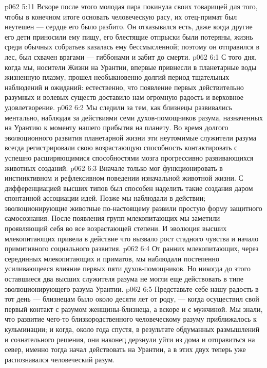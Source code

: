 \vs p062 5:11 Вскоре после этого молодая пара покинула своих товарищей для того, чтобы в конечном итоге основать человеческую расу, их отец\hyp{}примат был неутешен --- сердце его было разбито. Он отказывался есть, даже когда другие его дети приносили ему пищу, его блестящие отпрыски были потеряны, жизнь среди обычных собратьев казалась ему бессмысленной; поэтому он отправился в лес, был схвачен врагами --- гиббонами и забит до смерти.
\vs p062 6:1 С того дня, когда мы, носители Жизни на Урантии, впервые привнесли в планетарные воды жизненную плазму, прошел необыкновенно долгий период тщательных наблюдений и ожиданий: естественно, что появление первых действительно разумных и волевых существ доставило нам огромную радость и верховное удовлетворение.
\vs p062 6:2 Мы следили за тем, как близнецы развивались ментально, наблюдая за действиями семи духов\hyp{}помощников разума, назначенных на Урантию к моменту нашего прибытия на планету. Во время долгого эволюционного развития планетарной жизни эти неутомимые служители разума всегда регистрировали свою возрастающую способность контактировать с успешно расширяющимися способностями мозга прогрессивно развивающихся животных созданий.
\vs p062 6:3 Вначале только  мог функционировать в инстинктивном и рефлексивном поведении изначальной животной жизни. С дифференциацией высших типов  был способен наделить такие создания даром спонтанной ассоциации идей. Позже мы наблюдали  в действии; эволюционирующие животные по\hyp{}настоящему развили простую форму защитного самосознания. После появления групп млекопитающих мы заметили  проявляющий себя во все возрастающей степени. И эволюция высших млекопитающих привела в действие  что вызвало рост стадного чувства и начало примитивного социального развития.
\vs p062 6:4 От ранних млекопитающих, через серединных млекопитающих и приматов, мы наблюдали постепенно усиливающееся влияние первых пяти духов\hyp{}помощников. Но никогда до этого оставшиеся два высших служителя разума не могли еще действовать в типе эволюционирующего разума Урантии.
\vs p062 6:5 Представьте себе нашу радость в тот день --- близнецам было около десяти лет от роду, --- когда  осуществил свой первый контакт с разумом женщины\hyp{}близнеца, а вскоре и с мужчиной. Мы знали, что развитие чего\hyp{}то близкородственного человеческому разуму приближалось к кульминации; и когда, около года спустя, в результате обдуманных размышлений и сознательного решения, они наконец дерзнули уйти из дома и отправиться на север, именно тогда  начал действовать на Урантии, а в этих двух теперь уже распознавался человеческий разум.
